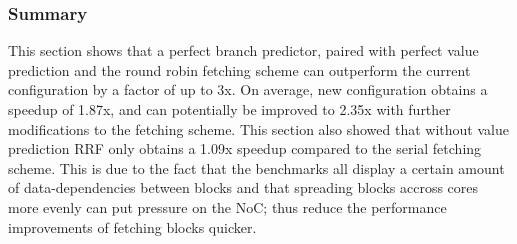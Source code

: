 \subsubsection{Summary}

This section shows that a perfect branch predictor, paired with perfect value prediction and the round robin fetching scheme can outperform the current configuration by a factor of up to 3x.
On average, new configuration obtains a speedup of 1.87x, and can potentially be improved to 2.35x with further modifications to the fetching scheme.
This section also showed that without value prediction RRF only obtains a 1.09x speedup compared to the serial fetching scheme.
This is due to the fact that the benchmarks all display a certain amount of data-dependencies between blocks and that spreading blocks accross cores more evenly can put pressure on the NoC; thus reduce the performance improvements of fetching blocks quicker.

